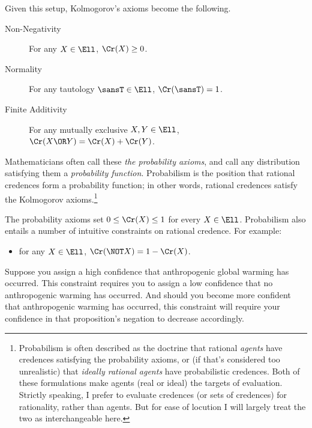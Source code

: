Given this setup, Kolmogorov's axioms become the following.
\begin{description}
\item[Non-Negativity] {For any $X \in \Ell$, $\Cr(X) \ge 0$.}
\item[Normality] {For any tautology $\sansT \in \Ell$, $\Cr(\sansT)=1$.}
\item[Finite Additivity] {For any mutually exclusive $X, Y \in \Ell$,\\ $\Cr(X \OR Y)=\Cr(X)+\Cr(Y)$.}  
\end{description}  
Mathematicians often call these \textit{the probability axioms}, and call any distribution satisfying them a \textit{probability function}. Probabilism is the position that rational credences form a probability function; in other words, rational credences satisfy the Kolmogorov axioms.\footnote
{Probabilism is often described as the doctrine that rational \emph{agents} have credences satisfying the probability axioms, or (if that's considered too unrealistic) that \emph{ideally rational agents} have probabilistic credences. Both of these formulations make agents (real or ideal) the targets of evaluation. Strictly speaking, I prefer to evaluate credences (or sets of credences) for rationality, rather than agents. But for ease of locution I will largely treat the two as interchangeable here.} 

The probability axioms set $0 \le \Cr(X) \le 1$ for every $X \in \Ell$. Probabilism also entails a number of intuitive constraints on rational credence. For example:
\begin{itemize}
\item{for any $X \in \Ell$, $\Cr(\NOT X)=1-\Cr(X)$.}
\end{itemize}
Suppose you assign a high confidence that anthropogenic global warming has occurred. This constraint requires you to assign a low confidence that no anthropogenic warming has occurred. And should you become more confident that anthropogenic warming has occurred, this constraint will require your confidence in that proposition's negation to decrease accordingly.

